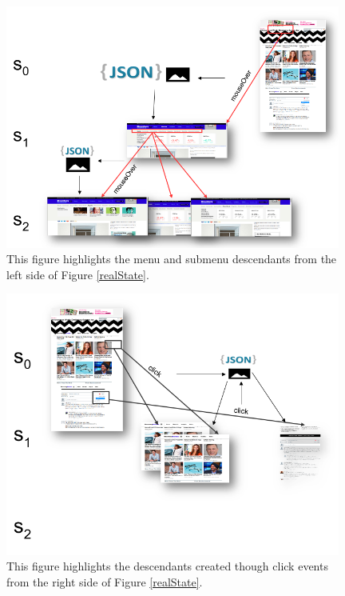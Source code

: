 \documentclass{sig-alternate}
\begin{document}
\begin{figure}[hp]
\centering
\includegraphics[width=0.98\textwidth]{./imgs/realStates_left.png}
\caption{This figure highlights the menu and submenu descendants from the left side of Figure \ref{realState}.}
\label{realStateL}
\end{figure}


\begin{figure}[hp]
\centering
\includegraphics[width=0.98\textwidth]{./imgs/realStates_right.png}
\caption{This figure highlights the descendants created though click events from the right side of Figure \ref{realState}.}
\label{realStateR}
\end{figure}
\end{document}
